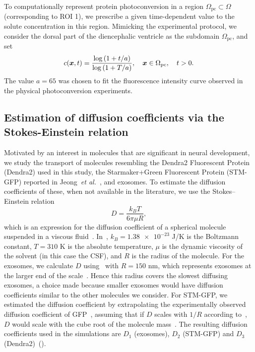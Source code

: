 \documentclass{WileyMSP-template}
\begin{document}
To computationally represent protein photoconversion in a region
$\Omega_{\mathrm{pc}} \subset \Omega$ (corresponding to ROI 1),
we prescribe a given time-dependent value to the solute concentration in this region. 
Mimicking the experimental protocol, we consider the dorsal part of the
diencephalic ventricle as the subdomain $\Omega_{\mathrm{pc}}$, and set
\begin{equation}
  c(\bm{x}, t)=\frac{\log{(1+t/a)}}{\log{(1+T/a)}},
  \quad \bm{x} \in \Omega_{\mathrm{pc}}, \quad t > 0.
\label{eq:photoconversion_curve}
\end{equation}
The value $a=65$ was chosen to fit the fluorescence intensity curve
observed in the physical photoconversion experiments.

\subsection{Estimation of diffusion coefficients via the Stokes-Einstein relation}
Motivated by an interest in molecules that are significant in neural development,
we study the transport of molecules resembling the Dendra2 Fluorescent Protein (Dendra2)
used in this study, the Starmaker+Green Fluorescent Protein (STM-GFP) reported in
Jeong~\emph{et al.}~\cite{Jeong2024TheZebrafish}, and exosomes.
To estimate the diffusion coefficients of these, when not
available in the literature, we use the Stokes--Einstein relation
\begin{equation}
    D = \frac{k_B T}{6\pi \mu R},
    \label{eq:D_stokes_einstein}
\end{equation}
which is an expression for the diffusion coefficient of a spherical
molecule suspended in a viscous fluid~\cite{Einstein1905UberTeilchen}.
In~, $k_B = \num{1.38e-23}$ J/K is the Boltzmann constant,
$T = 310$ K is the absolute temperature, $\mu$ is the dynamic viscosity of the
solvent (in this case the CSF), and $R$ is the radius of the molecule.
For the exosomes, we calculate $D$ using~
with $R=150$ nm, which represents exosomes at the larger end of the
scale~\cite{Moghassemi2024ExtracellularDecade}.
Hence this radius covers the slowest diffusing exosomes,
a choice made because smaller exosomes would have diffusion coefficients
similar to the other molecules we consider.
For STM-GFP, we estimated the diffusion coefficient by extrapolating
the experimentally observed diffusion coefficient of
GFP~\cite{Swaminathan1997PhotobleachingDiffusion, Potma2001ReducedCells},
assuming that if $D$ scales with $1/R$ according to~,
$D$ would scale with the cube root of the molecule mass~\cite{Goodhill1997DiffusionGuidance}.
The resulting diffusion coefficients used in the simulations
are $D_1$ (exosomes), $D_2$ (STM-GFP) and $D_3$ (Dendra2)~().
\end{document}
